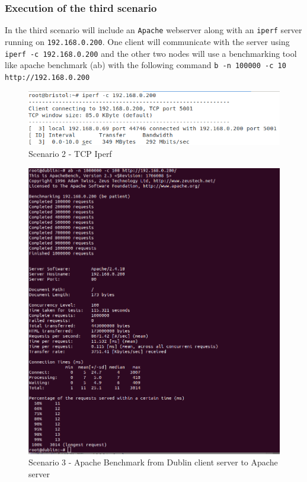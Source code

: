 \documentclass{article}
\begin{document}
\subsubsection{Execution of the third scenario}
In the third scenario will include an \texttt{Apache} webserver along with an \texttt{iperf} server running on \texttt{192.168.0.200}. One client will communicate with the server using \texttt{iperf -c 192.168.0.200} and the other two nodes will use a benchmarking tool like apache benchmark (ab) with the following command \texttt{b -n 100000 -c 10 http://192.168.0.200}


\begin{figure}[H]
\includegraphics[width=14cm]{figures/q-2-2-3-1.png}
\centering
\caption{Scenario 2 - TCP Iperf}
\centering
\label{fig:throughput_scenario_3}
\end{figure}


\begin{figure}[H]
\includegraphics[width=14cm]{figures/dublin-ab.png}
\centering
\caption{Scenario 3 - Apache Benchmark from Dublin client server to Apache server}
\centering
\label{fig:ab_dublin_scenario_3}
\end{figure}
\end{document}
